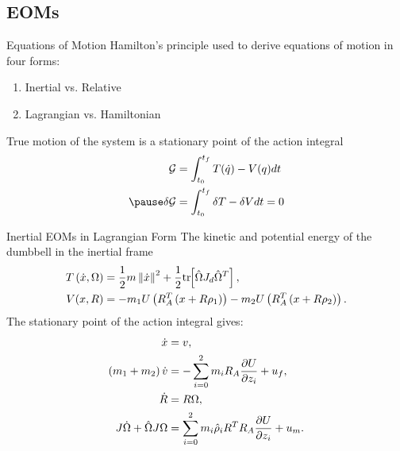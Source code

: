 \subsection{EOMs}



\begin{frame}{Equations of Motion}
    Hamilton's principle used to derive equations of motion in four forms:
    \begin{enumerate}
        \item Inertial vs. Relative 
        \item Lagrangian vs. Hamiltonian
    \end{enumerate}
    True motion of the system is a stationary point of the action integral
    \begin{align*}
        \mathcal{G} &= \int_{t_0}^{t_f} T(\dot q) - V(q) dt\\
        \pause
        \delta \mathcal{G} &= \int_{t_0}^{t_f} \delta T - \delta V dt = 0
    \end{align*}
\end{frame}

\begin{frame}{Inertial EOMs in Lagrangian Form}
    The kinetic and potential energy of the dumbbell in the inertial frame
    \begin{align*}
        T\left( \dot{x}, \Omega \right) &= \frac{1}{2} m \left\| \dot{x} \right\|^2 + \frac{1}{2} \mathrm{tr}\negthickspace\left[ \hat{\Omega} J_d \hat{\Omega}^T \right] , \\
        V( x, R ) &=  - m_1 U \left( R_A^T \left( x + R \rho_1 \right) \right) - m_2 U \left( R_A^T \left( x + R \rho_2 \right) \right). 
    \end{align*}
    \pause
    The stationary point of the action integral gives:
    \begin{align*}
        \dot{x} &= v, \\
        \left( m_1 + m_2 \right) \dot{v} &= - \sum_{i=0}^2 m_i R_A \frac{\partial U}{\partial z_i} + u_f, \\
        \dot{R} &= R \Omega, \\
        J \dot{\Omega} + \hat{\Omega} J \Omega &= \sum_{i=0}^2 m_i \hat{\rho}_i R^T R_A \frac{\partial U}{\partial z_i} + u_m. 
    \end{align*}
\end{frame}

